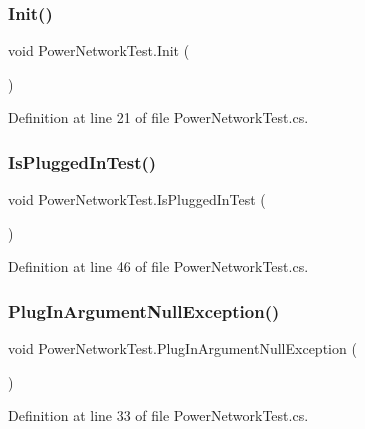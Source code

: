 \subsubsection{\texorpdfstring{Init()}{Init()}}
{\footnotesize\ttfamily void Power\+Network\+Test.\+Init (\begin{DoxyParamCaption}{ }\end{DoxyParamCaption})}



Definition at line 21 of file Power\+Network\+Test.\+cs.

\mbox{\label{class_power_network_test_a4dcc395caabda5d3b2ab7f6a620c6385}} 
\subsubsection{\texorpdfstring{Is\+Plugged\+In\+Test()}{IsPluggedInTest()}}
{\footnotesize\ttfamily void Power\+Network\+Test.\+Is\+Plugged\+In\+Test (\begin{DoxyParamCaption}{ }\end{DoxyParamCaption})}



Definition at line 46 of file Power\+Network\+Test.\+cs.

\mbox{\label{class_power_network_test_af2a34472832c104824ca14ec8b35c6b2}} 
\subsubsection{\texorpdfstring{Plug\+In\+Argument\+Null\+Exception()}{PlugInArgumentNullException()}}
{\footnotesize\ttfamily void Power\+Network\+Test.\+Plug\+In\+Argument\+Null\+Exception (\begin{DoxyParamCaption}{ }\end{DoxyParamCaption})}



Definition at line 33 of file Power\+Network\+Test.\+cs.

